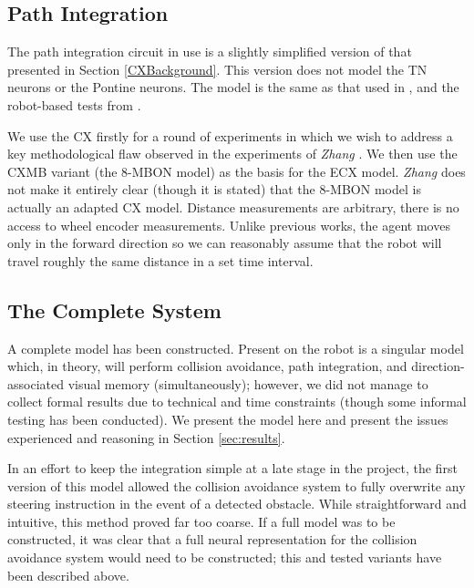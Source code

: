 \documentclass[a4paper,11pt,twoside,openright]{article}
\begin{document}
\subsection{ Path Integration }
The path integration circuit in use is a slightly simplified version of that
presented in Section \ref{CXBackground}. This version does not model the
TN neurons or the Pontine neurons. The model is the same as that used in
\cite{Scimeca2017, Zhang2017}, and the robot-based tests from \cite{Stone2017}.
\newline\par

We use the CX firstly for a round of experiments in which we wish to address a
key methodological flaw observed in the experiments of \textit{Zhang}
\cite{Zhang2017}. We then use the CXMB variant (the 8-MBON model)
as the basis for the ECX model. \textit{Zhang} does not make it entirely clear
(though it is stated) that the 8-MBON model is actually an adapted CX model.
Distance measurements are arbitrary, there is no access to wheel encoder
measurements. Unlike previous works, the agent moves only in the forward
direction so we can reasonably assume that the robot will travel roughly the same
distance in a set time interval.

\subsection{ The Complete System}
A complete model has been constructed. Present on the robot is a
singular model which, in theory, will perform collision avoidance,
path integration, and direction-associated visual memory
(simultaneously); however, we did not manage to collect formal results
due to technical and time constraints (though some informal testing
has been conducted). We present the model here and present the issues
experienced and reasoning in Section \ref{sec:results}.
\newline\par

In an effort to keep the integration simple at a late stage in the project,
the first version of this model allowed the collision avoidance system to fully
overwrite any steering instruction in the event of a detected obstacle. While
straightforward and intuitive, this method proved far too coarse. If a full
model was to be constructed, it was clear that a full neural representation
for the collision avoidance system would need to be constructed; this and
tested variants have been described above.
\newline\par
\end{document}
